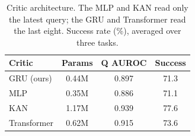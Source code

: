 \begin{table}[!t]
\centering
\small
\caption{Critic architecture. The MLP and KAN read only the latest query; the GRU and Transformer read the last eight. Success rate (\%), averaged over three tasks.}
\label{tab:critic-arch}
\begin{tabular}{@{}lccc@{}}
\toprule
Critic & Params & Q AUROC & Success \\
\midrule
\rowcolor{linkblue!12}
GRU (ours)  & 0.44M & 0.897 & 71.3 \\
MLP         & 0.35M & 0.886 & 71.1 \\
KAN         & 1.17M & 0.939 & 77.6 \\
Transformer & 0.62M & 0.915 & 73.6 \\
\bottomrule
\end{tabular}
\end{table}
